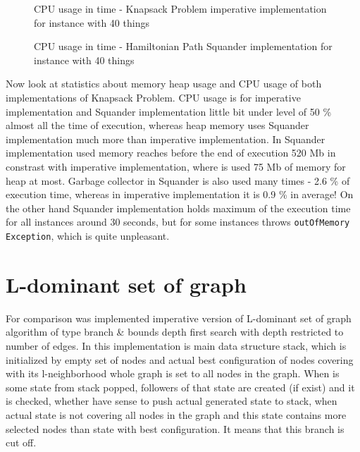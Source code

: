 \documentclass[11pt,twoside,a4paper]{book}
\begin{document}
\begin{figure}
\begin{center}

\caption{CPU usage in time - Knapsack Problem imperative implementation for instance with 40 things}
\label{fig:ksICpu40}
\end{center}
\end{figure}


\begin{figure}[ht]
\begin{center}

\caption{CPU usage in time - Hamiltonian Path Squander implementation for instance with 40 things}
\label{fig:ksSCpu40}
\end{center}
\end{figure}
\clearpage 

Now look at statistics about memory heap usage and CPU usage of both
implementations of Knapsack Problem. CPU usage is for imperative implementation
and Squander implementation little bit under level of 50 \% almost all the time
of execution, whereas heap memory uses Squander implementation much more than imperative
implementation. In Squander implementation used memory reaches before the end of
execution 520 Mb in constrast with imperative implementation, where is used 75
Mb of memory for heap at most. Garbage collector in Squander is also used many
times - 2.6 \% of execution time, whereas in imperative implementation it is
0.9 \% in average! On the other hand Squander implementation holds maximum of
the execution time for all instances around 30 seconds, but for some instances throws
\verb|outOfMemory Exception|, which is quite unpleasant.

\section{L-dominant set of graph}
\label{sec:ldsgComp}
For comparison was implemented imperative version of L-dominant set of graph
algorithm of type branch \& bounds depth first search with depth restricted to
number of edges. In this implementation is main data structure stack, which is
initialized by empty set of nodes and actual best configuration of nodes
covering with its l-neighborhood whole graph is set to all nodes in the graph.
When is some state from stack popped, followers of that state are created (if
exist) and it is checked, whether have sense to push actual generated state to
stack, when actual state is not covering all nodes in the graph and this state
contains more selected nodes than state with best configuration. It means that
this branch is cut off.
\end{document}
